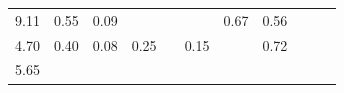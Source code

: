 \begin{refsection}[referencesCh3]
\begin{table}
\begin{adjustbox}{scale=0.65,center}
\begin{tabular}{@{}ccccccccccc@{}}
		9.11                                                         & 0.55                                                & 0.09                                                &                                                     &                                                     &                                                      & 0.67                                                & 0.56                                                  &                                                         &                                                      & \cite{Martin2}                                                                    \\
		4.70                                                         & 0.40                                                & 0.08                                                & 0.25                                                &                                                     & 0.15                                                 &                                                     & 0.72                                                  &                                                         &                                                      & \cite{Normak}                                                              \\
		5.65                                                         &                                                     &                                                     &                                                     &                                                     &                                                      &                                                     &                                                       &                                                         &                                                      & \cite{Xia}                                                                   \\ \bottomrule
	\end{tabular}
	\end{adjustbox}
\end{table}

\newpage


\end{refsection}
